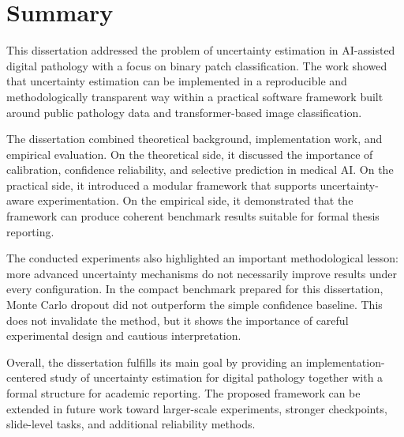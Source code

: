 \chapter{Summary}
\label{chap:summary}

This dissertation addressed the problem of uncertainty estimation in AI-assisted digital pathology with a focus on binary patch classification. The work showed that uncertainty estimation can be implemented in a reproducible and methodologically transparent way within a practical software framework built around public pathology data and transformer-based image classification.

The dissertation combined theoretical background, implementation work, and empirical evaluation. On the theoretical side, it discussed the importance of calibration, confidence reliability, and selective prediction in medical AI. On the practical side, it introduced a modular framework that supports uncertainty-aware experimentation. On the empirical side, it demonstrated that the framework can produce coherent benchmark results suitable for formal thesis reporting.

The conducted experiments also highlighted an important methodological lesson: more advanced uncertainty mechanisms do not necessarily improve results under every configuration. In the compact benchmark prepared for this dissertation, Monte Carlo dropout did not outperform the simple confidence baseline. This does not invalidate the method, but it shows the importance of careful experimental design and cautious interpretation.

Overall, the dissertation fulfills its main goal by providing an implementation-centered study of uncertainty estimation for digital pathology together with a formal structure for academic reporting. The proposed framework can be extended in future work toward larger-scale experiments, stronger checkpoints, slide-level tasks, and additional reliability methods.
